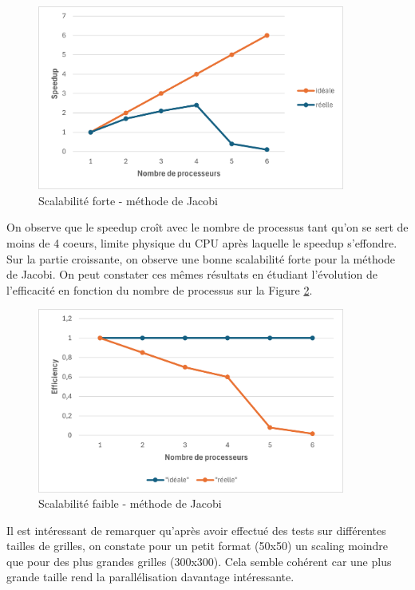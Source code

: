 \documentclass{article}
\begin{document}
\begin{figure}[H]
    \centering
    \includegraphics[width=0.9\textwidth]{strong_scaling_jacobi.png}
    \caption{Scalabilité forte - méthode de Jacobi}
    \label{fig:strongJac}
\end{figure}

On observe que le speedup croît avec le nombre de processus tant qu'on se sert de moins de 4 coeurs, limite physique du CPU après laquelle le speedup s'effondre. Sur la partie croissante, on observe une bonne scalabilité forte pour la méthode de Jacobi. On peut constater ces mêmes résultats en étudiant l'évolution de l'efficacité en fonction du nombre de processus sur la Figure \ref{fig:weakJac}.

\begin{figure}[H]
    \centering
    \includegraphics[width=0.9\textwidth]{weak_scaling_jacobi.png}
    \caption{Scalabilité faible - méthode de Jacobi}
    \label{fig:weakJac}
\end{figure}

Il est intéressant de remarquer qu'après avoir effectué des tests sur différentes tailles de grilles, on constate pour un petit format (50x50) un scaling moindre que pour des plus grandes grilles (300x300). Cela semble cohérent car une plus grande taille rend la parallélisation davantage intéressante.
\end{document}
